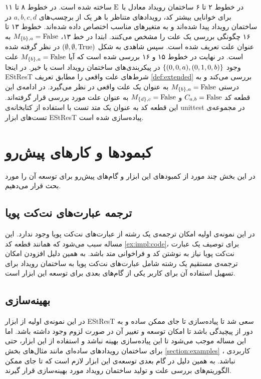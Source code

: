 در خطوط ۲ تا ۶ ساختمان رویداد معادل با 
$\mathrm{E}$
ساخته شده است.
در خطوط ۸ تا ۱۱ برای خوانایی بیشتر کد، رویداد‌های متناظر با هر یک از برچسب‌های 
$a,b,c,d$
در ساختمان رویداد پیدا شده‌اند و به متغیر‌های مناسب اختصاص داده شده‌اند.
خطوط ۱۳ تا ۱۶ چگونگی بررسی یک علت را مشخص می‌کنند.
ابتدا در خط ۱۳،
$M_{\{b\},a} = \mathrm{False}$
به عنوان علت تعریف شده است.
سپس شاهدی به شکل 
$(\emptyset,\emptyset,\mathrm{True})$
در نظر گرفته شده است.
در نهایت در خطوط ۱۵ و ۱۶ بررسی شده است که آیا 
$M_{\{b\},a} = \mathrm{False}$
علت وجود
$\{(0,0,a),(0,1,0,b)\}$
در پیکربندی‌های ساختمان رویداد است یا خیر.
در اینجا 
EStResT
شرط‌های علت واقعی را مطابق تعریف 
\ref{def:extended}
بررسی می‌کند و
به درستی 
$M_{\{b\},a} = \mathrm{False}$
به عنوان یک علت واقعی در نظر می‌گیرد.
در ادامه‌ی این قطعه کد 
$C_{a,b} = \mathrm{False}$
و 
$M_{\{d\},c} = \mathrm{False}$
به عنوان علت مورد بررسی قرار گرفته‌اند.
این قطعه کد به عنوان یک متد تست با استفاده از کتابخانه‌ی 
unittest
در مجموعه‌ی تست‌های ابزار 
EStResT
پیاده‌سازی شده است.

\section{کبمودها و کار‌های پیش‌رو}
در این بخش چند مورد از کمبود‌های این ابزار و گام‌های پیش‌رو برای 
توسعه آن را مورد بحث قرار می‌دهیم.

\subsection{ترجمه عبارت‌های 
نت‌کت پویا
}
در این نمونه‌ی اولیه امکان ترجمه‌ی یک رشته
از عبارت‌های نت‌کت پویا وجود ندارد.
این مساله سبب می‌شود که همانند قطعه کد
\ref{ex:impl:code}،
برای توصیف یک عبارت نت‌کت پویا نیاز به نوشتن کد و فراخوانی متد باشد.
به همین دلیل افزودن امکان ترجمه‌ی مستقیم یک رشته شامل عبارت‌های نت‌کت پویا به 
ساختمان رویداد برای تسهیل استفاده آن برای کاربر یکی از گام‌های بعدی برای توسعه این ابزار است.

\subsection{بهینه‌سازی}
در این نمونه‌ی اولیه از ابزار 
EStResT
سعی شد تا پیاده‌سازی تا جای ممکن ساده و به دور از پیچیدگی باشد تا امکان توسعه و تغییر آن در صورت لزوم وجود داشته باشد.
اما این مساله موجب می‌شود تا این پیاده‌سازی بهینه نباشد و استفاده
از این ابزار، حتی برای ساختمان رویداد‌های ساده‌ای مانند مثال‌های 
بخش
\ref{section:examples}
،
کاربردی نباشد.
به همین دلیل در گام بعدی توسعه‌ی این ابزار لازم است که تا جای ممکن 
الگوریتم‌های بررسی علت و تولید ساختمان رویداد مورد
 بهینه‌سازی قرار گیرند.